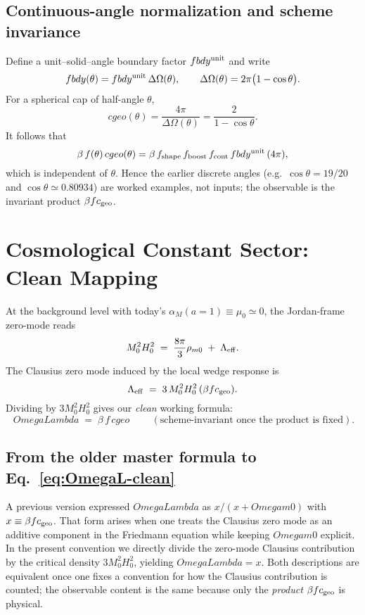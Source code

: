 \documentclass[aps,prd,onecolumn,superscriptaddress,nofootinbib]{revtex4-2}
\def\OmL{OmegaLambda}%
\def\Omm{Omega m0}%
\def\cgeo{cgeo}%
\def\fbdy{fbdy}%
\def\boxed#1{#1}%
\newcommand{\OmL}{\Omega_\Lambda}
\newcommand{\Omm}{\Omega_{m0}}
\newcommand{\cgeo}{c_{\rm geo}}
\newcommand{\fbdy}{f_{\rm bdy}}
\begin{document}
\subsection{Continuous-angle normalization and scheme invariance}
\label{sec:theta-invariance}
Define a unit–solid–angle boundary factor $\fbdy^{\rm unit}$ and write
\begin{equation}
\fbdy(\theta)=\fbdy^{\rm unit}\,\Delta\Omega(\theta),\qquad
\Delta\Omega(\theta)=2\pi\big(1-\cos\theta\big).
\end{equation}
For a spherical cap of half-angle $\theta$,
\begin{equation}
\cgeo(\theta)=\frac{4\pi}{\Delta\Omega(\theta)}=\frac{2}{1-\cos\theta}.
\end{equation}
It follows that
\begin{equation}
\beta\,f(\theta)\,\cgeo(\theta)
= \beta\,f_{\rm shape}\,f_{\rm boost}\,f_{\rm cont}\,\fbdy^{\rm unit}\,(4\pi),
\end{equation}
which is independent of $\theta$. Hence the earlier discrete angles (e.g.\ $\cos\theta=19/20$ and $\cos\theta\simeq0.80934$) are worked examples, not inputs; the observable is the invariant product $\beta f c_{\rm geo}$.

\section{Cosmological Constant Sector: Clean Mapping}
\label{sec:OmegaL}
At the background level with today’s \(\alpha_M(a{=}1)\equiv\mu_0\simeq 0\), the Jordan-frame zero-mode reads
\begin{equation}
M_0^2 H_0^2 \;=\; \frac{8\pi}{3}\rho_{m0}\;+\;\Lambda_{\rm eff}.
\end{equation}
The Clausius zero mode induced by the local wedge response is
\begin{equation}
\Lambda_{\rm eff} \;=\; 3\,M_0^2 H_0^2\,(\beta f c_{\rm geo}).
\end{equation}
Dividing by \(3M_0^2H_0^2\) gives our \emph{clean} working formula:
\begin{equation}
\boxed{\ \OmL \;=\; \beta\, f \, \cgeo\ }\qquad
(\text{scheme-invariant once the product is fixed}).
\label{eq:OmegaL-clean}
\end{equation}

\subsection{From the older master formula to Eq.~\eqref{eq:OmegaL-clean}}
\label{sec:Omega-evolution}
A previous version expressed \(\OmL\) as \(x/(x+\Omm)\) with \(x\equiv \beta f c_{\rm geo}\). That form arises when one treats the Clausius zero mode as an additive component in the Friedmann equation while keeping \(\Omm\) explicit. In the present convention we directly divide the zero-mode Clausius contribution by the critical density \(3M_0^2H_0^2\), yielding \(\OmL=x\). Both descriptions are equivalent once one fixes a convention for how the Clausius contribution is counted; the observable content is the same because only the \emph{product} \(\beta f c_{\rm geo}\) is physical.
\end{document}
